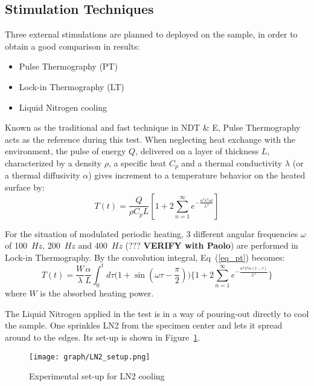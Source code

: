 \documentclass[]{spie}  %
\begin{document}
\subsection{Stimulation Techniques} %
\label{sub:stimulation_techniques}
Three external stimulations are planned to deployed on the sample, in order to obtain a good comparison in results: 
\begin{itemize}
   \item Pulse Thermography (PT) 
   \item Lock-in Thermography (LT)
   \item Liquid Nitrogen cooling 
\end{itemize}
Known as the traditional and fast technique in NDT \& E, Pulse Thermography acts as the reference during this test. When neglecting heat exchange with the environment, the pulse of energy $Q$, delivered on a layer of thickness $L$, characterized by a density $\rho$, a specific heat $C_p$ and a thermal conductivity $\lambda$ (or a thermal diffusivity $\alpha$) gives increment to a temperature behavior on the heated surface by:
\begin{equation}
   T(t) = \frac{Q}{\rho C_p L}[1+2\sum_{n=1}^{\infty} e^{-\frac{n^2 \pi ^2\alpha t}{L^2}}]
   \label{eq_pt}
\end{equation}

For the situation of modulated periodic heating, 3 different angular frequencies $\omega$ of 100~$Hz$, 200~$Hz$ and 400~$Hz$ (??? \textbf{VERIFY with Paolo}) are performed in Lock-in Thermography. By the convolution integral, Eq~(\ref{eq_pt}) becomes:
\begin{equation}
   T(t) = \frac{W}{\lambda}\frac{\alpha}{L}\int_0^t d\tau \Big(1+\sin(\omega \tau - \frac{\pi}{2})\Big)\Big\{1+2\sum_{n=1}^{\infty} e^{-\frac{n^2 \pi ^2\alpha(t-\tau)}{L^2}}\Big\}
\end{equation}
where $W$ is the absorbed heating power.

The Liquid Nitrogen applied in the test is in a way of pouring-out directly to cool the sample. One sprinkles LN2 from the specimen center and lets it spread around to the edges. Its set-up is shown in Figure~\ref{Exp_LN2}.

\begin{figure}[ht]
   \centering
   \texttt{[image: graph/LN2\_setup.png]}
   \caption{Experimental set-up for LN2 cooling}
   \label{Exp_LN2}
\end{figure}

\end{document}
